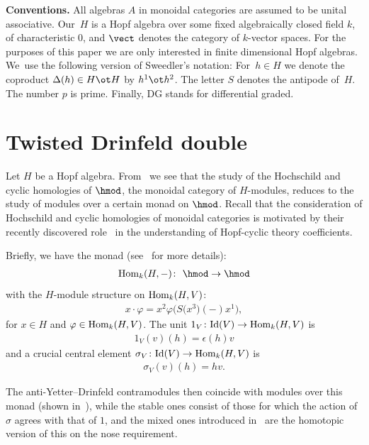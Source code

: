 \noindent \textbf{Conventions.} All algebras $A$ in monoidal categories are assumed to be unital associative. Our~$H$ is a Hopf algebra over some fixed algebraically closed field $k$, of characteristic $0$, and $\vect$ denotes the category of $k$-vector spaces. For the purposes of this paper we are only interested in finite dimensional Hopf algebras. We~use the following version of Sweedler's notation: For~$h\in H$ we denote the coproduct $\Delta(h)\in H\ot H$ by $h^1\ot h^2$. The letter $S$ denotes the antipode of~$H$. The number $p$ is prime. Finally, DG stands for differential graded.

\section{Twisted Drinfeld double}
Let $H$ be a Hopf algebra. From~\cite{chern} we see that the study of the Hochschild and cyclic homologies of $\hmod$, the monoidal category of $H$-modules, reduces to the study of modules over a certain monad on $\hmod$. Recall that the consideration of Hochschild and cyclic homologies of monoidal categories is motivated by their recently discovered role~\cite{chern} in the understanding of Hopf-cyclic theory coefficients.

Briefly, we have the monad (see~\cite{chern} for more details):
\begin{gather}\label{themonad}
\mathop{\rm Hom}\nolimits_k(H,-)\colon \ \hmod\to\hmod
\end{gather}
with the $H$-module structure on $\mathop{\rm Hom}\nolimits_k(H,V)$:
\begin{gather}
x\cdot\varphi=x^2\varphi\big(S\big(x^3\big)(-)x^1\big),
\end{gather}
for $x\in H$ and $\varphi\in \mathop{\rm Hom}\nolimits_k(H,V)$. The unit $1_V\colon {\rm Id}(V)\to \mathop{\rm Hom}\nolimits_k(H,V)$ is
\begin{gather}
1_V(v)(h)=\epsilon(h)v
\end{gather}
and a crucial central element $\sigma_V\colon {\rm Id}(V)\to \mathop{\rm Hom}\nolimits_k(H,V)$ is
\begin{gather}
\sigma_V(v)(h)=hv.
\end{gather}

The anti-Yetter--Drinfeld contramodules then coincide with modules over this monad (shown in~\cite{chern}), while the stable ones consist of those for which the action of $\sigma$ agrees with that of $1$, and the mixed ones introduced in~\cite{chern} are the homotopic version of this on the nose requirement.

